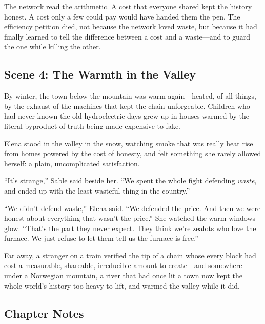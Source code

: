 The network read the arithmetic. A cost that everyone shared kept the history
honest. A cost only a few could pay would have handed them the pen. The efficiency
petition died, not because the network loved waste, but because it had finally
learned to tell the difference between a cost and a waste---and to guard the one
while killing the other.

\hypertarget{scene-4-the-warmth-in-the-valley}{%
\subsection{Scene 4: The Warmth in the
Valley}\label{scene-4-the-warmth-in-the-valley}}

By winter, the town below the mountain was warm again---heated, of all things, by
the exhaust of the machines that kept the chain unforgeable. Children who had never
known the old hydroelectric days grew up in houses warmed by the literal byproduct
of truth being made expensive to fake.

Elena stood in the valley in the snow, watching smoke that was really heat rise
from homes powered by the cost of honesty, and felt something she rarely allowed
herself: a plain, uncomplicated satisfaction.

``It's strange,'' Sable said beside her. ``We spent the whole fight defending
\emph{waste}, and ended up with the least wasteful thing in the country.''

``We didn't defend waste,'' Elena said. ``We defended the price. And then we were
honest about everything that wasn't the price.'' She watched the warm windows
glow. ``That's the part they never expect. They think we're zealots who love the
furnace. We just refuse to let them tell us the furnace is free.''

Far away, a stranger on a train verified the tip of a chain whose every block had
cost a measurable, shareable, irreducible amount to create---and somewhere under a
Norwegian mountain, a river that had once lit a town now kept the whole world's
history too heavy to lift, and warmed the valley while it did.

\hypertarget{chapter-17-notes}{%
\subsection{Chapter Notes}\label{chapter-17-notes}}


